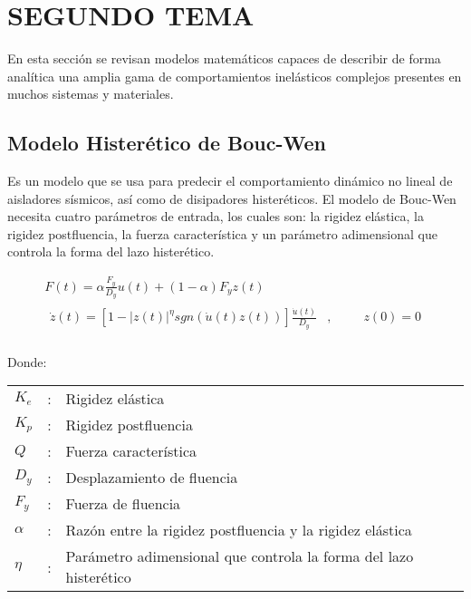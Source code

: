 \section{SEGUNDO TEMA}

En esta sección se revisan modelos matemáticos capaces de describir de forma analítica una amplia gama de comportamientos inelásticos complejos presentes en muchos sistemas y materiales.

	\subsection{Modelo Histerético de Bouc-Wen} \label{subsection:MHBW}
	
Es un modelo que se usa para predecir el comportamiento dinámico no lineal de aisladores sísmicos, así como de disipadores histeréticos. El modelo de Bouc-Wen necesita cuatro parámetros de entrada, los cuales son: la rigidez elástica, la rigidez postfluencia, la fuerza característica y un parámetro adimensional que controla la forma del lazo histerético.

\begin{gather}
F(t)=\alpha \frac{F_{y}}{D_{y}}u(t)+(1-\alpha)F_{y}z(t)				\label{BoucWen1} \\
\begin{aligned}
\dot{z}(t)=\left[1-\left|z(t)\right |^{\eta}sgn(\dot{u}(t)z(t))\right]\frac{\dot{u}(t)}{D_{y}}&,&\hspace{1em}& z(0)=0 \\
\end{aligned}		\label{BoucWen2}
\end{gather}




Donde:

\begin{tabular}{L{0.5 cm}p{0.025 cm}p{11.5 cm}}
  $K_{e}$ & : & Rigidez elástica \\
  $K_{p}$ & : & Rigidez postfluencia \\
  $Q$     & : & Fuerza característica \\
  $D_{y}$ & : & Desplazamiento de fluencia \\
  $F_{y}$ & : & Fuerza de fluencia \\
  $\alpha$ & : & Razón entre la rigidez postfluencia y la rigidez elástica  \\
  $\eta$ & : & Parámetro adimensional que controla la forma del lazo histerético \\
 \end{tabular}\\

	
 
 